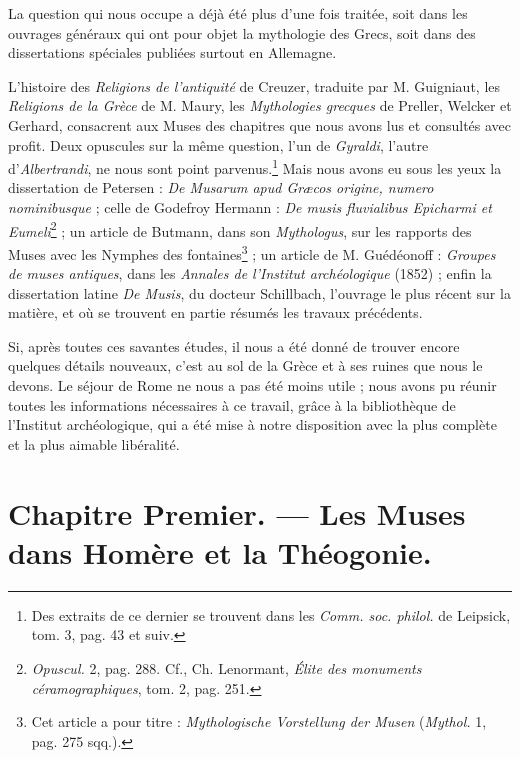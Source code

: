 \documentclass[a4paper, 11pt, oneside, polutonikogreek, french]{article}
\begin{document}
La question qui nous occupe a déjà été plus d'une fois traitée, soit dans les ouvrages généraux qui ont pour objet la mythologie des Grecs, soit dans des dissertations spéciales publiées surtout en Allemagne.

L'histoire des \emph{Religions de l'antiquité} de Creuzer, traduite par M. Guigniaut, les \emph{Religions de la Grèce} de M. Maury, les \emph{Mythologies grecques} de Preller, Welcker et Gerhard, consacrent aux Muses des chapitres que nous avons lus et consultés avec profit. Deux opuscules sur la même question, l'un de \emph{Gyraldi}, l'autre d'\emph{Albertrandi}, ne nous sont point parvenus.\footnote{Des extraits de ce dernier se trouvent dans les \emph{Comm. soc. philol.} de Leipsick, tom. 3, pag. 43 et suiv.} Mais nous avons eu sous les yeux la dissertation de Petersen : \emph{De Musarum apud Græcos origine, numero nominibusque} ; celle de Godefroy Hermann : \emph{De musis fluvialibus Epicharmi et Eumeli}\footnote{\emph{Opuscul.} 2, pag. 288. Cf., Ch. Lenormant, \emph{Élite des monuments céramographiques}, tom. 2, pag. 251.} ; un article de Butmann, dans son \emph{Mythologus}, sur les rapports des Muses avec les Nymphes des fontaines\footnote{Cet article a pour titre : \emph{Mythologische Vorstellung der Musen} (\emph{Mythol.} 1, pag. 275 sqq.).} ; un article de M. Guédéonoff : \emph{Groupes de muses antiques}, dans les \emph{Annales de l'Institut archéologique} (1852) ; enfin la dissertation latine \emph{De Musis}, du docteur Schillbach, l'ouvrage le plus récent sur la matière, et où se trouvent en partie résumés les travaux précédents.

Si, après toutes ces savantes études, il nous a été donné de trouver encore quelques détails nouveaux, c'est au sol de la Grèce et à ses ruines que nous le devons. Le séjour de Rome ne nous a pas été moins utile ; nous avons pu réunir toutes les informations nécessaires à ce travail, grâce à la bibliothèque de l'Institut archéologique, qui a été mise à notre disposition avec la plus complète et la plus aimable libéralité.
\clearpage
\section{Chapitre Premier. --- Les Muses dans Homère et la Théogonie.}
\end{document}
